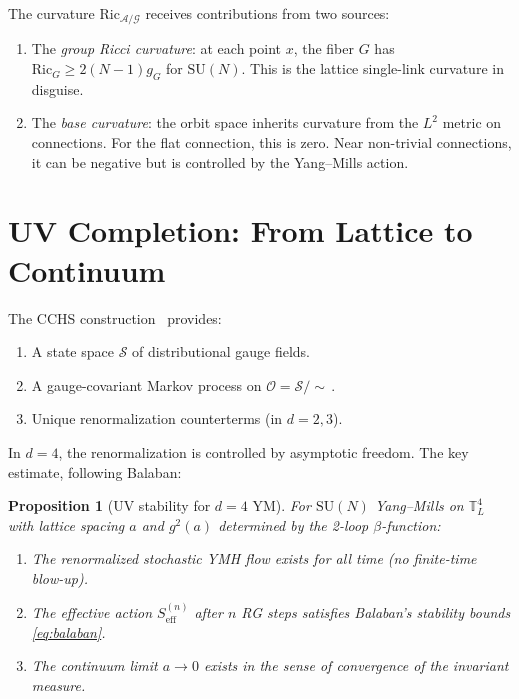 \documentclass[11pt,a4paper]{article}
\theoremstyle{plain}
\newtheorem{proposition}[theorem]{Proposition}
\theoremstyle{definition}
\theoremstyle{remark}
\newcommand{\T}{\mathbb{T}}
\newcommand{\cA}{\mathcal{A}}
\newcommand{\cG}{\mathcal{G}}
\newcommand{\cO}{\mathcal{O}}
\newcommand{\cS}{\mathcal{S}}
\newcommand{\SU}{\mathrm{SU}}
\begin{document}
The curvature $\mathrm{Ric}_{\cA/\cG}$ receives contributions
from two sources:
\begin{enumerate}[nosep]
\item The \emph{group Ricci curvature}: at each point $x$, the
  fiber $G$ has $\mathrm{Ric}_G \ge 2(N-1)g_G$ for $\SU(N)$.
  This is the lattice single-link curvature in disguise.
\item The \emph{base curvature}: the orbit space inherits
  curvature from the $L^2$ metric on connections. For the
  flat connection, this is zero. Near non-trivial connections,
  it can be negative but is controlled by the Yang--Mills action.
\end{enumerate}

\section{UV Completion: From Lattice to Continuum}\label{sec:UV}

The CCHS construction~\cite{CCHS2022} provides:
\begin{enumerate}[nosep]
\item A state space $\cS$ of distributional gauge fields.
\item A gauge-covariant Markov process on $\cO = \cS/\!\sim$\,.
\item Unique renormalization counterterms (in $d = 2, 3$).
\end{enumerate}

In $d = 4$, the renormalization is controlled by asymptotic
freedom. The key estimate, following Balaban:

\begin{proposition}[UV stability for $d = 4$ YM]\label{prop:UV}
For $\SU(N)$ Yang--Mills on $\T^4_L$ with lattice spacing $a$
and $g^2(a)$ determined by the 2-loop $\beta$-function:
\begin{enumerate}[nosep]
\item The renormalized stochastic YMH flow exists for all time
  (no finite-time blow-up).
\item The effective action $S_{\mathrm{eff}}^{(n)}$ after $n$ RG
  steps satisfies Balaban's stability bounds \eqref{eq:balaban}.
\item The continuum limit $a \to 0$ exists in the sense of
  convergence of the invariant measure.
\end{enumerate}
\end{proposition}
\end{document}
